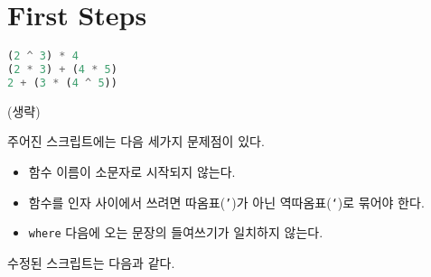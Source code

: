\chapter{\Large{First Steps}}


\begin{lstlisting}[language=Haskell,escapeinside=~~]
(2 ^ 3) * 4
(2 * 3) + (4 * 5)
2 + (3 * (4 ^ 5))
\end{lstlisting}


(생략)


주어진 스크립트에는 다음 세가지 문제점이 있다.
\begin{itemize}
\item 함수 이름이 소문자로 시작되지 않는다.
\item 함수를 인자 사이에서 쓰려면 따옴표(\texttt{'})가 아닌
  역따옴표(\texttt{`})로 묶어야 한다.
\item \texttt{where} 다음에 오는 문장의 들여쓰기가 일치하지 않는다.
\end{itemize}

수정된 스크립트는 다음과 같다.








